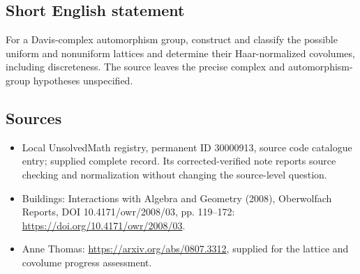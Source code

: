 \documentclass[11pt]{article}
\begin{document}
\subsection{Short English statement}
For a Davis-complex automorphism group, construct and classify the possible uniform and nonuniform lattices and determine their Haar-normalized covolumes, including discreteness. The source leaves the precise complex and automorphism-group hypotheses unspecified.
\subsection{Sources}
\begin{itemize}
\item Local UnsolvedMath registry, permanent ID 30000913, source code catalogue entry; supplied complete record. Its corrected-verified note reports source checking and normalization without changing the source-level question.
\item Buildings: Interactions with Algebra and Geometry (2008), Oberwolfach Reports, DOI 10.4171/owr/2008/03, pp. 119--172: \url{https://doi.org/10.4171/owr/2008/03}.
\item Anne Thomas: \url{https://arxiv.org/abs/0807.3312}, supplied for the lattice and covolume progress assessment.
\end{itemize}
\end{document}
